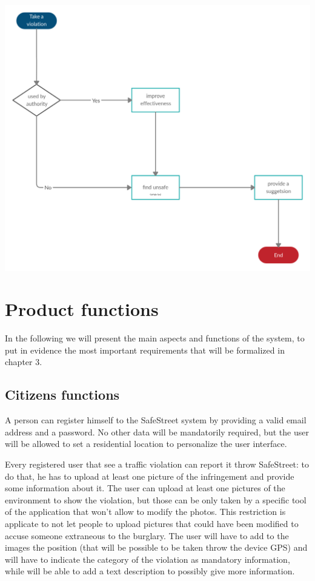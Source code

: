 \documentclass[a4paper, hidelinks, 12pt]{report}
\begin{document}
    \begin{center}
        \includegraphics[scale = 0.30]{assets/buildStatistics.jpg}\\[1.6 cm]
    \end{center}
        \section{Product functions}\label{sec:product-functions}
         In the following we will present the main aspects and functions of the system, to put in evidence the most important requirements that will be formalized in chapter 3.
    \subsection{Citizens functions}\label{subsec:citizen-functions}
    A person can register himself to the SafeStreet system by providing a valid email address and a password. No other data will be mandatorily required, but the user will be allowed to set a residential location to personalize the user interface.

    Every registered user that see a traffic violation can report it throw SafeStreet: to do that, he has to upload at least one picture of the infringement and provide some information about it. The user can upload at least one pictures of the environment to show the violation, but those can be only taken by a specific tool of the application that won't allow to modify the photos. This restriction is applicate to not let people to upload pictures that could have been modified to accuse someone extraneous to the burglary. The user will have to add to the images the position (that will be possible to be taken throw the device GPS) and will have to indicate the category of the violation as mandatory information, while will be able to add a text description to possibly give more information.
\end{document}
